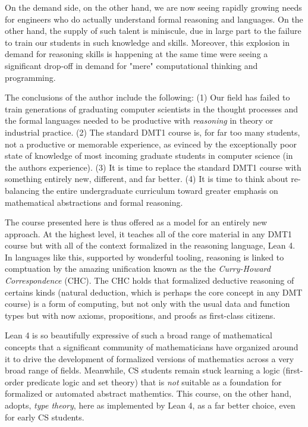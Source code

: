 \documentclass{book}
\begin{document}
On the demand side, on the other hand, we are now seeing rapidly growing needs for engineers who do actually understand formal reasoning and languages. On the other hand, the supply of such talent is miniscule, due in large part to the failure to train our students in such knowledge and skills. Moreover, this explosion in demand for reasoning skills is happening at the same time we\textquotesingle re seeing a significant drop-off in demand for "mere" computational thinking and programming.

The conclusions of the author include the following: (1) Our field has failed to train generations of graduating computer scientists in the thought processes and the formal languages needed to be productive with \emph{reasoning} in theory or industrial practice. (2) The standard DMT1 course is, for far too many students, not a productive or memorable experience, as evinced by the exceptionally poor state of knowledge of most incoming graduate students in computer science (in the author\textquotesingle s experience). (3) It is time to replace the standard DMT1 course with something entirely new, different, and far better. (4) It is time to think about re-balancing the entire undergraduate curriculum toward greater emphasis on mathematical abstractions and formal reasoning.

The course presented here is thus offered as a model for an entirely new approach. At the highest level, it teaches all of the core material in any DMT1 course but with all of the context formalized in the reasoning language, Lean 4. In languages like this, supported by wonderful tooling, reasoning is linked to comptuation by the amazing unification known as the the \emph{Curry-Howard Correspondence} (CHC). The CHC holds that formalized deductive reasoning of certains kinds (natural deduction, which is perhaps the core concept in any DMT course) is a form of computing, but not only with the usual data and function types but with now axioms, propositions, and proofs as first-class citizens.

Lean 4 is so beautifully expressive of such a broad range of mathematical concepts that a significant community of mathematicians have organized around it to drive the development of formalized versions of mathematics across a very broad range of fields. Meanwhile, CS students remain stuck learning a logic (first-order predicate logic and set theory) that is \emph{not} suitable as a foundation for formalized or automated abstract mathemtics. This course, on the other hand, adopts, \emph{type theory}, here as implemented by Lean 4, as a far better choice, even for early CS students.
\end{document}
